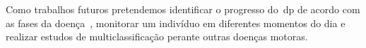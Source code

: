 Como trabalhos futuros pretendemos identificar o progresso do~\ac{dp} de acordo com as fases da doença~\cite{protpar010}, monitorar um indivíduo em diferentes momentos do dia e realizar estudos de multiclassificação perante outras doenças motoras.



